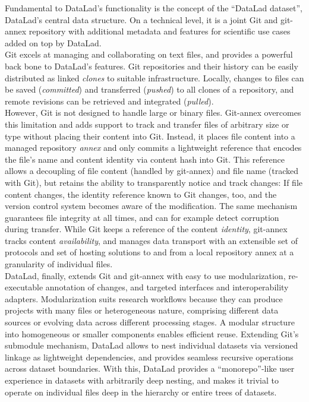 {Fundamental to DataLad's functionality is the concept of the ``DataLad dataset'', DataLad's central data structure.
On a technical level, it is a joint Git and git-annex repository with additional metadata and features for scientific use cases added on top by DataLad.\\
Git excels at managing and collaborating on text files, and provides a powerful back bone to DataLad's features.
Git repositories and their history can be easily distributed as linked \textit{clones} to suitable infrastructure.
Locally, changes to files can be saved (\textit{committed}) and transferred (\textit{pushed}) to all clones of a repository, and remote revisions can be retrieved and integrated (\textit{pulled}).\\
However, Git is not designed to handle large or binary files.
Git-annex overcomes this limitation and adds support to track and transfer files of arbitrary size or type without placing their content into Git.
Instead, it places file content into a managed repository \textit{annex} and only commits a lightweight reference that encodes the file's name and content identity via content hash into Git.
This reference allows a decoupling of file content (handled by git-annex) and file name (tracked with Git), but retains the ability to transparently notice and track changes: If file content changes, the identity reference known to Git changes, too, and the version control system becomes aware of the modification.
The same mechanism guarantees file integrity at all times, and can for example detect corruption during transfer.
While Git keeps a reference of the content \textit{identity}, git-annex tracks content \textit{availability}, and manages data transport with an extensible set of protocols and set of hosting solutions to and from a local repository annex at a granularity of individual files. \\
DataLad, finally, extends Git and git-annex with easy to use modularization, re-executable annotation of changes, and targeted interfaces and interoperability adapters.
Modularization suits research workflows because they can produce projects with many files or heterogeneous nature, comprising different data sources or evolving data across different processing stages.
A modular structure into homogeneous or smaller components enables efficient reuse.
Extending Git’s submodule mechanism, DataLad allows to nest individual datasets via versioned linkage as lightweight dependencies, and provides seamless recursive operations across dataset boundaries.
With this, DataLad provides a ``monorepo''-like user experience in datasets with arbitrarily deep nesting, and makes it trivial to operate on individual files deep in the hierarchy or entire trees of datasets.
}
